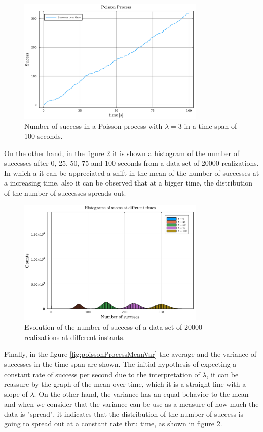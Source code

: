 \documentclass[main.tex]{subfiles}
\begin{document}
\begin{figure}[ht!]
    \centering
    \includegraphics[width=0.8\textwidth]{imgs/hw5/poissonProcess.pdf}
    \caption{Number of success in a Poisson process with $\lambda=3$ in a time span of 100 seconds.}
    \label{fig:poissonProcess}
\end{figure}

On the other hand, in the figure \ref{fig:poissonProcessHisto} it is shown a histogram of the number of successes after 0, 25, 50, 75 and 100 seconds from a data set of \num{20000} realizations.
In which a it can be appreciated a shift in the mean of the number of successes at a increasing time, also it can be observed that at a bigger time, the distribution of the number of successes spreads out.

\begin{figure}[ht!]
    \centering
    \includegraphics[width=0.8\textwidth]{imgs/hw5/poissonProcessHistograms.pdf}
    \caption{
    Evolution of the number of success of a data set of \num{20000} realizations at different instants.
    }
    \label{fig:poissonProcessHisto}
\end{figure}

Finally, in the figure \ref{fig:poissonProcessMeanVar} the average and the variance of successes in the time span are shown.
The initial hypothesis of expecting a constant rate of success per second due to the interpretation of $\lambda$, it can be reassure by the graph of the mean over time, which it is a straight line with a slope of $\lambda$.
On the other hand, the variance has an equal behavior to the mean and when we consider that the variance can be use as a measure of how much the data is "spread", it indicates that the distribution of the number of success is going to spread out at a constant rate thru time, as shown in figure \ref{fig:poissonProcessHisto}.
\end{document}
